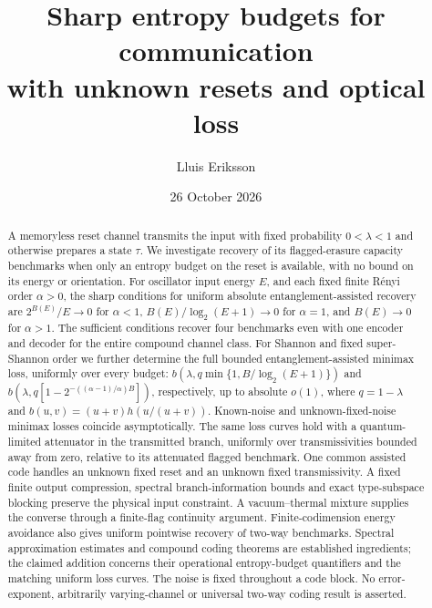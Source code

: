 \documentclass[11pt]{article}
\title{Sharp entropy budgets for communication\\with unknown resets and optical loss}
\author{Lluis Eriksson}
\date{26 October 2026}
\begin{document}
\maketitle
\begin{abstract}
A memoryless reset channel transmits the input with fixed probability
\(0<\lambda<1\) and otherwise prepares a state \(\tau\).
We investigate recovery of its flagged-erasure capacity benchmarks when
only an entropy budget on the reset is available, with no bound on its
energy or orientation. For oscillator input energy \(E\), and each fixed
finite R\'enyi order \(\alpha>0\), the sharp conditions for uniform absolute
entanglement-assisted recovery are \(2^{B(E)}/E\to0\) for \(\alpha<1\),
\(B(E)/\log_2(E+1)\to0\) for \(\alpha=1\), and \(B(E)\to0\) for
\(\alpha>1\). The sufficient conditions recover four benchmarks even with
one encoder and decoder for the entire compound channel class.
For Shannon and fixed super-Shannon order we further determine the full
bounded entanglement-assisted minimax loss, uniformly over every budget:
\(b(\lambda,q\min\{1,B/\log_2(E+1)\})\) and
\(b(\lambda,q[1-2^{-((\alpha-1)/\alpha)B}])\), respectively, up to
absolute \(o(1)\), where \(q=1-\lambda\) and
\(b(u,v)=(u+v)h(u/(u+v))\).
Known-noise and unknown-fixed-noise minimax losses coincide asymptotically.
The same loss curves hold with a quantum-limited attenuator in the
transmitted branch, uniformly over transmissivities bounded away from
zero, relative to its attenuated flagged benchmark. One common assisted
code handles an unknown fixed reset and an unknown fixed transmissivity.
A fixed finite output compression, spectral branch-information bounds and
exact type-subspace blocking preserve the physical input constraint.
A vacuum--thermal mixture supplies the converse through a finite-flag
continuity argument. Finite-codimension energy avoidance also gives uniform
pointwise recovery of two-way benchmarks. Spectral approximation estimates
and compound coding theorems are established ingredients; the claimed
addition concerns their operational entropy-budget quantifiers and the
matching uniform loss curves.
The noise is fixed throughout a code block. No error-exponent, arbitrarily
varying-channel or universal two-way coding result is asserted.
\end{abstract}
\end{document}
